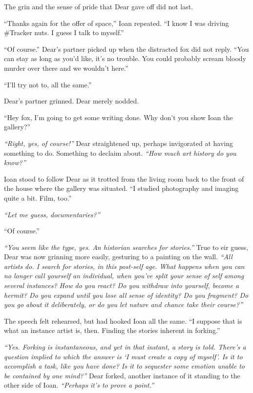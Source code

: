 The grin and the sense of pride that Dear gave off did not last.

``Thanks again for the offer of space,'' Ioan repeated. ``I know I was driving \#Tracker nuts. I guess I talk to myself.''

``Of course.'' Dear's partner picked up when the distracted fox did not reply. ``You can stay as long as you'd like, it's no trouble. You could probably scream bloody murder over there and we wouldn't here.''

``I'll try not to, all the same.''

Dear's partner grinned. Dear merely nodded.

``Hey fox, I'm going to get some writing done. Why don't you show Ioan the gallery?''

\emph{``Right, yes, of course!''} Dear straightened up, perhaps invigorated at having something to do. Something to declaim about. \emph{``How much art history do you know?''}

Ioan stood to follow Dear as it trotted from the living room back to the front of the house where the gallery was situated. ``I studied photography and imaging quite a bit. Film, too.''

\emph{``Let me guess, documentaries?''}

``Of course.''

\emph{``You seem like the type, yes. An historian searches for stories.''} True to eir guess, Dear was now grinning more easily, gesturing to a painting on the wall. \emph{``All artists do. I search for stories, in this post-self age. What happens when you can no longer call yourself an individual, when you've split your sense of self among several instances? How do you react? Do you withdraw into yourself, become a hermit? Do you expand until you lose all sense of identity? Do you fragment? Do you go about it deliberately, or do you let nature and chance take their course?''}

The speech felt rehearsed, but had hooked Ioan all the same. ``I suppose that is what an instance artist is, then. Finding the stories inherent in forking.''

\emph{``Yes. Forking is instantaneous, and yet in that instant, a story is told. There's a question implied to which the answer is `I must create a copy of myself'. Is it to accomplish a task, like you have done? Is it to sequester some emotion unable to be contained by one mind?''} Dear forked, another instance of it standing to the other side of Ioan. \emph{``Perhaps it's to prove a point.''}

